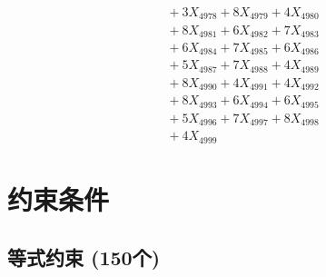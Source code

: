 \documentclass[a4paper,10pt]{article}
\begin{document}
{\begin{align}
&\;  + 3 X_{4978} + 8 X_{4979} + 4 X_{4980} \\[0.3ex]
&\;  + 8 X_{4981} + 6 X_{4982} + 7 X_{4983} \\[0.3ex]
&\;  + 6 X_{4984} + 7 X_{4985} + 6 X_{4986} \\[0.3ex]
&\;  + 5 X_{4987} + 7 X_{4988} + 4 X_{4989} \\[0.5ex]\allowbreak
&\;  + 8 X_{4990} + 4 X_{4991} + 4 X_{4992} \\[0.3ex]
&\;  + 8 X_{4993} + 6 X_{4994} + 6 X_{4995} \\[0.3ex]
&\;  + 5 X_{4996} + 7 X_{4997} + 8 X_{4998} \\[0.3ex]
&\;  + 4 X_{4999}\nonumber
\end{align}
}

\section{约束条件}

\subsection{等式约束 (150个)}
\end{document}
